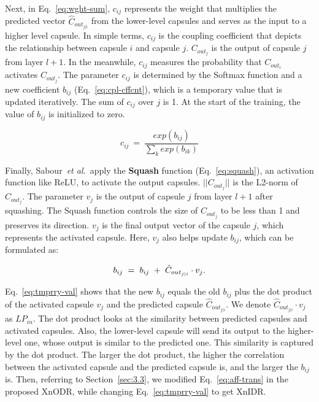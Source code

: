 \documentclass[sn-mathphys,iicol,Numbered]{sn-jnl}
\newcommand{\etal}{\textit{et al.}}
\begin{document}
Next, in Eq.~\ref{eq:wght-sum}, $c_{ij}$ represents the weight that multiplies the predicted vector $\hat{C}_{out_{j|i}}$ from the lower-level capsules and serves as the input to a higher level capsule. In simple terms, $c_{ij}$ is the coupling coefficient that depicts the relationship between capsule $i$ and capsule $j$. $C_{out_{j}}$ is the output of capsule $j$ from layer $l+1$. In the meanwhile, $c_{ij}$ measures the probability that $C_{out_{i}}$ activates $C_{out_{j}}$. The parameter $c_{ij}$ is determined by the Softmax function and a new coefficient $b_{ij}$ (Eq.~\ref{eq:cpl-cffcnt}), which is a temporary value that is updated iteratively. The sum of $c_{ij}$ over $j$ is 1. At the start of the training, the value of $b_{ij}$ is initialized to zero.

\begin{equation} \label{eq:cpl-cffcnt}
c_{ij}\ =\ \frac{exp(b_{ij})}{\sum_{k}exp(b_{ik})}
\end{equation}

Finally, Sabour~\etal~apply the \textbf{Squash} function (Eq.~\ref{eq:squash}), an activation function like ReLU, to activate the output capsules. $||C_{out_{j}}||$ is the L2-norm of $C_{out_{j}}$. The parameter $v_{j}$ is the output of capsule $j$ from layer $l+1$ after squashing. The Squash function controls the size of $C_{out_{j}}$ to be less than 1 and preserves its direction. $v_{j}$ is the final output vector of the capsule $j$, which represents the activated capsule. Here, $v_{j}$ also helps update $b_{ij}$, which can be formulated as:

\begin{equation}\small \label{eq:tmprry-val}
b_{ij}\ =\ b_{ij}\ +\ \hat{C}_{out_{j|i}}\cdot v_{j}.
\end{equation}

Eq.~\ref{eq:tmprry-val} shows that the new $b_{ij}$ equals the old $b_{ij}$ plus the dot product of the activated capsule $v_{j}$ and the predicted capsule $\hat{C}_{out_{j|i}}$. We denote $\hat{C}_{out_{j|i}}\cdot v_{j}$ as $LP_{in}$. The dot product looks at the similarity between predicted capsules and activated capsules. Also, the lower-level capsule will send its output to the higher-level one, whose output is similar to the predicted one. This similarity is captured by the dot product. The larger the dot product, the higher the correlation between the activated capsule and the predicted capsule is, and the larger the $b_{ij}$ is. Then, referring to Section~\ref{sec:3.3}, we modified Eq.~\ref{eq:aff-trans} in the proposed XnODR, while changing Eq.~\ref{eq:tmprry-val} to get XnIDR.
\end{document}
